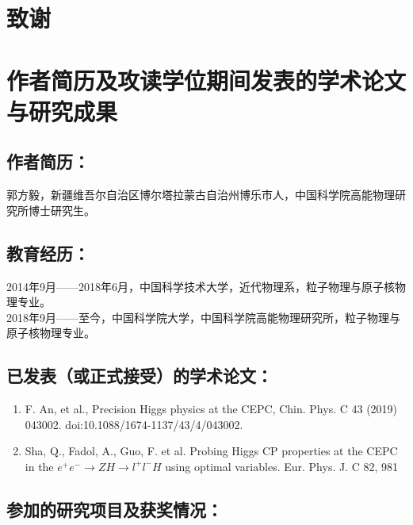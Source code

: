\chapter[致谢]{致\quad 谢}%

\chapter{作者简历及攻读学位期间发表的学术论文与研究成果}

\section*{作者简历：}
郭方毅，新疆维吾尔自治区博尔塔拉蒙古自治州博乐市人，中国科学院高能物理研究所博士研究生。\\

\section{教育经历：}
2014年9月——2018年6月，中国科学技术大学，近代物理系，粒子物理与原子核物理专业。\\
2018年9月——至今，中国科学院大学，中国科学院高能物理研究所，粒子物理与原子核物理专业。\\


\section*{已发表（或正式接受）的学术论文：}
{
\setlist[enumerate]{}%
\begin{enumerate}[nosep]
    \item F. An, et al., Precision Higgs physics at the CEPC, Chin. Phys. C 43 (2019) 043002. doi:10.1088/1674-1137/43/4/043002.
    \item Sha, Q., Fadol, A., Guo, F. et al. Probing Higgs CP properties at the CEPC in the $e^+ e^- \to ZH \to l^+ l^- H$ using optimal variables. Eur. Phys. J. C 82, 981
\end{enumerate}
}



\section*{参加的研究项目及获奖情况：}


\cleardoublepage[plain]%
